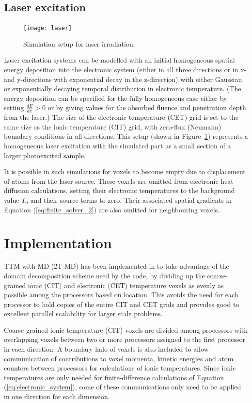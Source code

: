 \subsection*{Laser excitation}

\begin{figure}[h]
	\centering
	{
		\texttt{[image: laser]}
	}
	\caption{Simulation setup for laser irradiation.}
	\label{fig:laser}
\end{figure}
Laser excitation systems can be modelled with an initial homogeneous
spatial energy deposition into the electronic system (either in all three directions
or in x- and y-directions with exponential decay in the z-direction) with either Gaussian
or exponentially decaying temporal distribution in electronic temperature.
(The energy deposition can be specified for the fully homogeneous case
either by setting $\frac{dE}{dx} > 0$ or by giving values for the absorbed fluence
and penetration depth from the laser.) The size of the electronic temperature (CET)
grid is set to the same size as the ionic temperature (CIT) grid, with zero-flux
(Neumann) boundary conditions in all directions. This setup (shown in Figure~\ref{fig:laser})
represents a homogeneous laser excitation with the simulated part as a
small section of a larger photoexcited sample.

It is possible in such simulations for voxels to become empty due to displacement
of atoms from the laser source. These voxels are omitted from electronic heat diffusion
calculations, setting their electronic temperatures to the background value $T_0$ and
their source terms to zero. Their associated spatial gradients in Equation (\ref{eq:finite_solver_2})
are also omitted for neighbouring voxels.

\section{Implementation}

TTM with MD (2T-MD) has been implemented in \D to take advantage
of the domain decomposition scheme used by the code,
by dividing up the coarse-grained ionic (CIT) and electronic (CET)
temperature voxels as evenly as possible among the processors based on
location. This avoids the need for each processor to hold copies of the
entire CIT and CET grids and provides good to excellent parallel scalability
for larger scale problems.

Coarse-grained ionic temperature (CIT) voxels are divided among processors
with overlapping voxels between two or more processors assigned to the
first processor in each direction. A boundary halo of voxels is also included
to allow communication of contributions to voxel momenta, kinetic energies and
atom counters between processors for calculations of ionic temperatures. Since
ionic temperatures are only needed for finite-difference calculations of
Equation (\ref{eq:electronic_system}), some of these communications only
need to be applied in one direction for each dimension.

